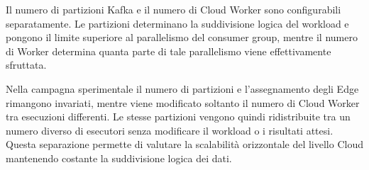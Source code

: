 Il numero di partizioni Kafka e il numero di Cloud Worker sono configurabili
separatamente. Le partizioni determinano la suddivisione logica del workload
e pongono il limite superiore al parallelismo del consumer group, mentre il
numero di Worker determina quanta parte di tale parallelismo viene
effettivamente sfruttata.

Nella campagna sperimentale il numero di partizioni e l'assegnamento degli
Edge rimangono invariati, mentre viene modificato soltanto il numero di Cloud
Worker tra esecuzioni differenti. Le stesse partizioni vengono quindi
ridistribuite tra un numero diverso di esecutori senza modificare il workload
o i risultati attesi. Questa separazione permette di valutare la scalabilità
orizzontale del livello Cloud mantenendo costante la suddivisione logica dei
dati.
